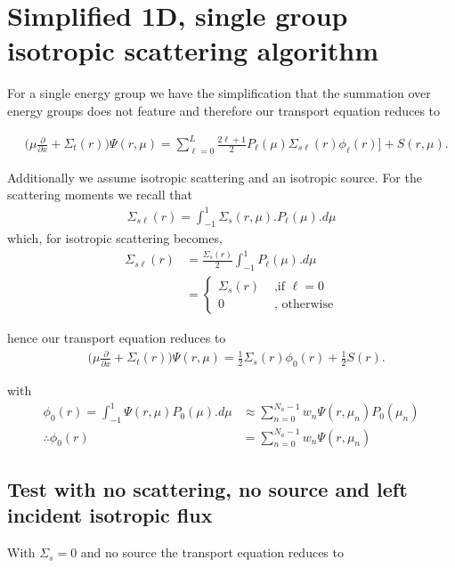 \documentclass[11pt,letterpaper,titlepage]{article}
\numberwithin{equation}{section}
\newcommand{\beq}{\begin{equation*}
\begin{aligned}}
\newcommand{\eeq}{\end{aligned}
\end{equation*}}
\begin{document}
\newpage
\section{Simplified 1D, single group isotropic scattering algorithm}
For a single energy group we have the simplification that the summation over energy groups does not feature and therefore our transport equation reduces to

\begin{equation} 
\begin{aligned}
&\biggr(\mu\frac{\partial}{\partial x} +\Sigma_{t} (r)\biggr)  \Psi (r,\mu)
= \sum_{\ell=0}^{L}\frac{2\ell+1}{2}P_\ell(\mu)
\Sigma_{s\ell} (r)
  \phi_{\ell} (r)
\biggr]
+  S (r,\mu).
\end{aligned}
\end{equation}

Additionally we assume isotropic scattering and an isotropic source. For the scattering moments we recall that 
\beq 
\Sigma_{s\ell}(r) = \int_{-1}^1 \Sigma_s (r,\mu).P_{\ell}(\mu).d\mu
\eeq 
which, for isotropic scattering becomes, 
\beq 
\Sigma_{s\ell}(r) &= \frac{\Sigma_s(r)}{2} \int_{-1}^1 P_{\ell}(\mu).d\mu \\
&=
\begin{cases}
\Sigma_s(r) &\text{ ,if }\ell=0 \\
0    &\text{ , otherwise}
\end{cases} 
\eeq 

hence our transport equation reduces to 
\begin{equation} 
\begin{aligned}
&\biggr(\mu\frac{\partial}{\partial x} +\Sigma_{t} (r)\biggr)  \Psi (r,\mu)
= \frac{1}{2}
\Sigma_{s} (r)
  \phi_{0} (r)
+  \frac{1}{2}S (r).
\end{aligned}
\end{equation}

with
\beq
\phi_{0} (r)= \int_{-1}^1 \Psi(r,\mu)P_0(\mu).d\mu &\approx 
\sum_{n=0}^{N_a-1} w_n \Psi(r,\mu_n)P_0(\mu_n) \\
\therefore \phi_0 (r)&=\sum_{n=0}^{N_a-1} w_n \Psi(r,\mu_n)
\eeq 



\subsection{Test with no scattering, no source and left incident isotropic flux}
With $\Sigma_s=0$ and no source the transport equation reduces to
\end{document}

